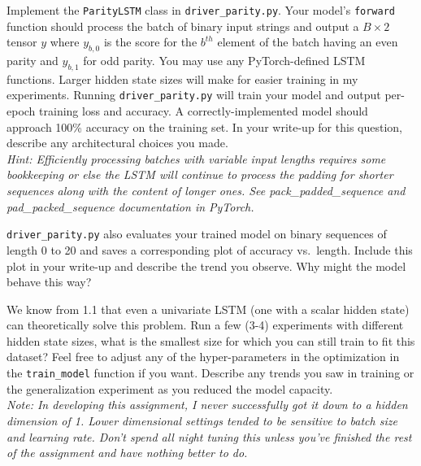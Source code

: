 \documentclass[a4paper,10pt]{article}
\begin{document}
\vspace{5pt}
\begin{taskbox}
 Implement the \texttt{ParityLSTM} class in \texttt{driver\_parity.py}. Your model's \texttt{forward} function should process the batch of binary input strings and output a $B \times 2$ tensor $y$ where $y_{b,0}$ is the score for the $b^{th}$ element of the batch having an even parity and $y_{b,1}$ for odd parity. You may use any PyTorch-defined LSTM functions. Larger hidden state sizes will make for easier training in my experiments. Running \texttt{driver\_parity.py} will train your model and output per-epoch training loss and accuracy. A correctly-implemented model should approach 100\% accuracy on the training set. In your write-up for this question, describe any architectural choices you made.\\[5pt]

\emph{Hint: Efficiently processing batches with variable input lengths requires some bookkeeping or else the LSTM will continue to process the padding for shorter sequences along with the content of longer ones. See pack\_padded\_sequence and pad\_packed\_sequence documentation in PyTorch.}
\end{taskbox}
\vspace{5pt}


\vspace{5pt}
\begin{taskbox}
 \texttt{driver\_parity.py} also evaluates your trained model on binary sequences of length 0 to 20 and saves a corresponding plot of accuracy vs.~length. Include this plot in your write-up and describe the trend you observe. Why might the model behave this way?
\end{taskbox}
\vspace{5pt}

\vspace{5pt}
\begin{taskbox}
 We know from 1.1 that even a univariate LSTM (one with a scalar hidden state) can theoretically solve this problem. Run a few (3-4) experiments with different hidden state sizes, what is the smallest size for which you can still train to fit this dataset? Feel free to adjust any of the hyper-parameters in the optimization in the \texttt{train\_model} function if you want. Describe any trends you saw in training or the generalization experiment as you reduced the model capacity.\\[5pt]

\emph{Note: In developing this assignment, I never successfully got it down to a hidden dimension of 1. Lower dimensional settings tended to be sensitive to batch size and learning rate. Don't spend all night tuning this unless you've finished the rest of the assignment and have nothing better to do.}
\end{taskbox}
\vspace{5pt}
\end{document}
